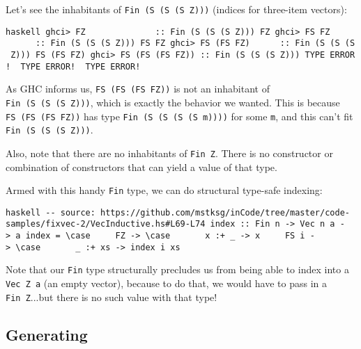 \documentclass[]{article}
\begin{document}
Let's see the inhabitants of
\texttt{Fin\ (\textquotesingle{}S\ (\textquotesingle{}S\ (\textquotesingle{}S\ \textquotesingle{}Z)))}
(indices for three-item vectors):

\texttt{haskell\ ghci\textgreater{}\ FZ\ \ \ \ \ \ \ \ \ \ \ \ \ \ ::\ Fin\ (\textquotesingle{}S\ (\textquotesingle{}S\ (\textquotesingle{}S\ \textquotesingle{}Z)))\ FZ\ ghci\textgreater{}\ FS\ FZ\ \ \ \ \ \ \ \ \ \ \ ::\ Fin\ (\textquotesingle{}S\ (\textquotesingle{}S\ (\textquotesingle{}S\ \textquotesingle{}Z)))\ FS\ FZ\ ghci\textgreater{}\ FS\ (FS\ FZ)\ \ \ \ \ \ ::\ Fin\ (\textquotesingle{}S\ (\textquotesingle{}S\ (\textquotesingle{}S\ \textquotesingle{}Z)))\ FS\ (FS\ FZ)\ ghci\textgreater{}\ FS\ (FS\ (FS\ FZ))\ ::\ Fin\ (\textquotesingle{}S\ (\textquotesingle{}S\ (\textquotesingle{}S\ \textquotesingle{}Z)))\ TYPE\ ERROR!\ \ TYPE\ ERROR!\ \ TYPE\ ERROR!}

As GHC informs us, \texttt{FS\ (FS\ (FS\ FZ))} is not an inhabitant of
\texttt{Fin\ (\textquotesingle{}S\ (\textquotesingle{}S\ (\textquotesingle{}S\ \textquotesingle{}Z)))},
which is exactly the behavior we wanted. This is because
\texttt{FS\ (FS\ (FS\ FZ))} has type
\texttt{Fin\ (\textquotesingle{}S\ (\textquotesingle{}S\ (\textquotesingle{}S\ (\textquotesingle{}S\ m))))}
for some \texttt{m}, and this can't fit
\texttt{Fin\ (\textquotesingle{}S\ (\textquotesingle{}S\ (\textquotesingle{}S\ \textquotesingle{}Z)))}.

Also, note that there are no inhabitants of \texttt{Fin\ \textquotesingle{}Z}.
There is no constructor or combination of constructors that can yield a value of
that type.

Armed with this handy \texttt{Fin} type, we can do structural type-safe
indexing:

\texttt{haskell\ -\/-\ source:\ https://github.com/mstksg/inCode/tree/master/code-samples/fixvec-2/VecInductive.hs\#L69-L74\ index\ ::\ Fin\ n\ -\textgreater{}\ Vec\ n\ a\ -\textgreater{}\ a\ index\ =\ \textbackslash{}case\ \ \ \ \ FZ\ -\textgreater{}\ \textbackslash{}case\ \ \ \ \ \ \ x\ :+\ \_\ -\textgreater{}\ x\ \ \ \ \ FS\ i\ -\textgreater{}\ \textbackslash{}case\ \ \ \ \ \ \ \_\ :+\ xs\ -\textgreater{}\ index\ i\ xs}

Note that our \texttt{Fin} type structurally precludes us from being able to
index into a \texttt{Vec\ \textquotesingle{}Z\ a} (an empty vector), because to
do that, we would have to pass in a \texttt{Fin\ \textquotesingle{}Z}...but
there is no such value with that type!

\subsection{Generating}
\end{document}
